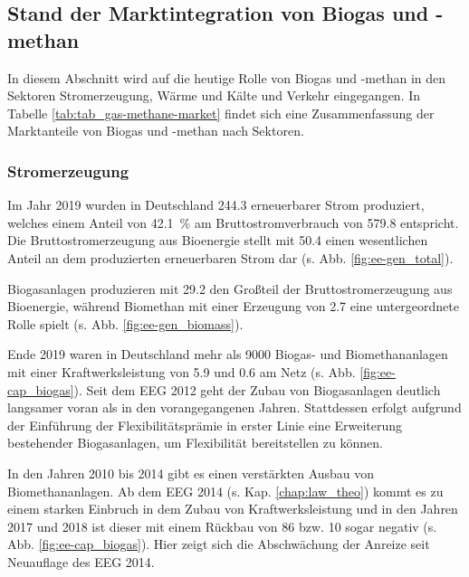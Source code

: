 \subsection{Stand der Marktintegration von Biogas und -methan}

In diesem Abschnitt wird auf die heutige Rolle von Biogas und -methan in den Sektoren Stromerzeugung, Wärme und Kälte und Verkehr eingegangen. In Tabelle \ref{tab:tab_gas-methane-market} findet sich eine Zusammenfassung der Marktanteile von Biogas und -methan nach Sektoren.



\subsubsection{Stromerzeugung}

Im Jahr 2019 wurden in Deutschland \SI{244.3}{\twh} erneuerbarer Strom produziert, welches einem Anteil von \SI{42.1}{\percent} am Bruttostromverbrauch von \SI{579.8}{\twh} entspricht. Die Bruttostromerzeugung aus Bioenergie stellt mit \SI{50.4}{\twh} einen wesentlichen Anteil an dem produzierten erneuerbaren Strom dar (s. Abb. \ref{fig:ee-gen_total}). \parencite{BWE2020} 



Biogasanlagen produzieren mit \SI{29.2}{\twh} den Großteil der Bruttostromerzeugung aus Bioenergie, während Biomethan mit einer Erzeugung von \SI{2.7}{\twh} eine untergeordnete Rolle spielt (s. Abb. \ref{fig:ee-gen_biomass}). \parencite{BWE2020} 



Ende 2019 waren in Deutschland mehr als \SI{9000}{\relax} Biogas- und Biomethananlagen mit einer Kraftwerksleistung von \SI{5.9}{\gw} und \SI{0.6}{\gw} am Netz (s. Abb. \ref{fig:ee-cap_biogas}). Seit dem \gls{EEG} 2012 geht der Zubau von Biogasanlagen deutlich langsamer voran als in den vorangegangenen Jahren. Stattdessen erfolgt aufgrund der Einführung der Flexibilitätsprämie in erster Linie eine Erweiterung bestehender Biogasanlagen, um Flexibilität bereitstellen zu können. \parencite{BWE2020} \parencite{DanielGromke2019}



In den Jahren 2010 bis 2014 gibt es einen verstärkten Ausbau von Biomethananlagen. Ab dem \gls{EEG} 2014 (s. Kap. \ref{chap:law_theo}) kommt es zu einem starken Einbruch in dem Zubau von Kraftwerksleistung und in den Jahren 2017 und 2018 ist dieser mit einem Rückbau von \SI{86}{\mw} bzw. \SI{10}{\mw} sogar negativ (s. Abb. \ref{fig:ee-cap_biogas}). Hier zeigt sich die Abschwächung der Anreize seit Neuauflage des \gls{EEG} 2014. \parencite{BWE2020} \smallskip

